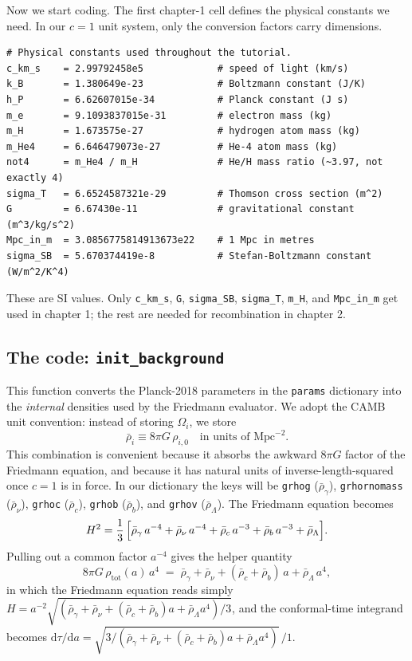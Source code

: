 Now we start coding. The first chapter-1 cell defines the physical constants we need. In our $c = 1$ unit system, only the conversion factors carry dimensions.

\begin{codebox}
\begin{lstlisting}[style=python]
# Physical constants used throughout the tutorial.
c_km_s    = 2.99792458e5             # speed of light (km/s)
k_B       = 1.380649e-23             # Boltzmann constant (J/K)
h_P       = 6.62607015e-34           # Planck constant (J s)
m_e       = 9.1093837015e-31         # electron mass (kg)
m_H       = 1.673575e-27             # hydrogen atom mass (kg)
m_He4     = 6.646479073e-27          # He-4 atom mass (kg)
not4      = m_He4 / m_H              # He/H mass ratio (~3.97, not exactly 4)
sigma_T   = 6.6524587321e-29         # Thomson cross section (m^2)
G         = 6.67430e-11              # gravitational constant (m^3/kg/s^2)
Mpc_in_m  = 3.0856775814913673e22    # 1 Mpc in metres
sigma_SB  = 5.670374419e-8           # Stefan-Boltzmann constant (W/m^2/K^4)
\end{lstlisting}
\end{codebox}

These are SI values. Only \texttt{c\_km\_s}, \texttt{G}, \texttt{sigma\_SB}, \texttt{sigma\_T}, \texttt{m\_H}, and \texttt{Mpc\_in\_m} get used in chapter 1; the rest are needed for recombination in chapter 2.

\subsection{The code: \texttt{init\_background}}

This function converts the Planck-2018 parameters in the \texttt{params} dictionary into the \emph{internal} densities used by the Friedmann evaluator. We adopt the CAMB unit convention: instead of storing $\Omega_i$, we store
\[
  \bar\rho_i \equiv 8\pi G\, \rho_{i,0}\quad \text{in units of } \mathrm{Mpc}^{-2}.
\]
This combination is convenient because it absorbs the awkward $8\pi G$ factor of the Friedmann equation, and because it has natural units of inverse-length-squared once $c = 1$ is in force. In our dictionary the keys will be \texttt{grhog} ($\bar\rho_\gamma$), \texttt{grhornomass} ($\bar\rho_\nu$), \texttt{grhoc} ($\bar\rho_c$), \texttt{grhob} ($\bar\rho_b$), and \texttt{grhov} ($\bar\rho_\Lambda$). The Friedmann equation becomes
\[
  H^2 = \frac{1}{3}\,\Bigl[\bar\rho_\gamma\, a^{-4} + \bar\rho_\nu\, a^{-4} + \bar\rho_c\, a^{-3} + \bar\rho_b\, a^{-3} + \bar\rho_\Lambda\Bigr].
\]
Pulling out a common factor $a^{-4}$ gives the helper quantity
\begin{equation}
  8\pi G\, \rho_\mathrm{tot}(a)\, a^4 \;=\; \bar\rho_\gamma + \bar\rho_\nu + (\bar\rho_c + \bar\rho_b)\, a + \bar\rho_\Lambda\, a^4,
  \label{eq:rho_total_a4}
\end{equation}
in which the Friedmann equation reads simply $H = a^{-2}\sqrt{(\bar\rho_\gamma + \bar\rho_\nu + (\bar\rho_c + \bar\rho_b)a + \bar\rho_\Lambda a^4)/3}$, and the conformal-time integrand becomes $\mathrm{d}\tau/\mathrm{d}a = \sqrt{3 / (\bar\rho_\gamma + \bar\rho_\nu + (\bar\rho_c + \bar\rho_b)a + \bar\rho_\Lambda a^4)}\,/1$.

